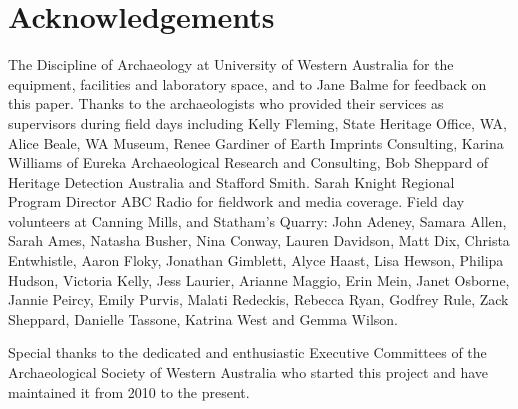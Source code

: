 \documentclass{ijsra}
\begin{document}
\section{Acknowledgements}

The Discipline of Archaeology at University of Western Australia for the equipment, facilities and laboratory space, and to Jane Balme for feedback on this paper. Thanks to the archaeologists who provided their services as supervisors during field days including Kelly Fleming, State Heritage Office, WA, Alice Beale, WA Museum, Renee Gardiner of Earth Imprints Consulting, Karina Williams of Eureka Archaeological Research and Consulting, Bob Sheppard of Heritage Detection Australia and Stafford Smith. Sarah Knight Regional Program Director ABC Radio for fieldwork and media coverage. Field day volunteers at Canning Mills, and Statham’s Quarry: John Adeney, Samara Allen, Sarah Ames, Natasha Busher, Nina Conway, Lauren Davidson, Matt Dix, Christa Entwhistle, Aaron Floky, Jonathan Gimblett, Alyce Haast, Lisa Hewson, Philipa Hudson, Victoria Kelly, Jess Laurier, Arianne Maggio, Erin Mein, Janet Osborne, Jannie Peircy, Emily Purvis, Malati Redeckis, Rebecca Ryan, Godfrey Rule, Zack Sheppard, Danielle Tassone, Katrina West and Gemma Wilson.

Special thanks to the dedicated and enthusiastic Executive Committees of the Archaeological Society of Western Australia who started this project and have maintained it from 2010 to the present.


\clearpage
\IJSRAclosing
\end{document}
